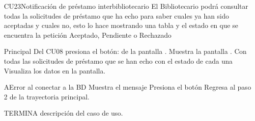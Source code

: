 
	\begin{UseCase}{CU23}{Notificación de préstamo interbibliotecario}{
		El Bibliotecario podrá consultar todas la solicitudes de préstamo que ha echo para saber cuales ya han sido aceptadas y cuales no, esto lo hace mostrando una tabla y el estado en que se encuentra la petición Aceptado, Pendiente o Rechazado
	}
	\end{UseCase}
	\begin{UCtrayectoria}{Principal}
		\UCpaso[\UCactor] Del CU08 presiona el botón:   de la pantalla .
		\UCpaso[\UCsist]Muestra la pantalla . Con todas las solicitudes de préstamo que se han echo con el estado de cada una
		\UCpaso[\UCactor]Visualiza los datos en la pantalla.
	\end{UCtrayectoria}
		\begin{UCtrayectoriaA}{A}{Error al conectar a la BD}
			\UCpaso[\UCsist] Muestra el mensaje 
			\UCpaso[\UCactor] Presiona el botón 
			\UCpaso[\UCsist] Regresa al paso 2 de la trayectoria principal.
		\end{UCtrayectoriaA}
TERMINA descripción del caso de uso.
